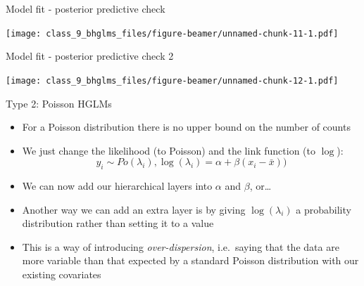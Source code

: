 \documentclass[ignorenonframetext,]{beamer}
\newenvironment{Shaded}{\begin{snugshade}}{\end{snugshade}}
\newcommand{\KeywordTok}[1]{\textcolor[rgb]{0.13,0.29,0.53}{\textbf{#1}}}
\newcommand{\DataTypeTok}[1]{\textcolor[rgb]{0.13,0.29,0.53}{#1}}
\newcommand{\DecValTok}[1]{\textcolor[rgb]{0.00,0.00,0.81}{#1}}
\newcommand{\StringTok}[1]{\textcolor[rgb]{0.31,0.60,0.02}{#1}}
\newcommand{\OperatorTok}[1]{\textcolor[rgb]{0.81,0.36,0.00}{\textbf{#1}}}
\newcommand{\NormalTok}[1]{#1}
\begin{document}
\begin{frame}[fragile]{Model fit - posterior predictive check}

\begin{Shaded}
\end{Shaded}

\texttt{[image: class\_9\_bhglms\_files/figure-beamer/unnamed-chunk-11-1.pdf]}

\end{frame}

\begin{frame}{Model fit - posterior predictive check 2}

\texttt{[image: class\_9\_bhglms\_files/figure-beamer/unnamed-chunk-12-1.pdf]}

\end{frame}

\begin{frame}{Type 2: Poisson HGLMs}

\begin{itemize}
\item
  For a Poisson distribution there is no upper bound on the number of
  counts
\item
  We just change the likelihood (to Poisson) and the link function (to
  \(\log\)):
  \[y_i \sim Po(\lambda_i), \log(\lambda_i) = \alpha + \beta (x_i - \bar{x}))\]
\item
  We can now add our hierarchical layers into \(\alpha\) and \(\beta\),
  or\ldots{}
\item
  Another way we can add an extra layer is by giving \(\log(\lambda_i)\)
  a probability distribution rather than setting it to a value
\item
  This is a way of introducing \emph{over-dispersion}, i.e.~saying that
  the data are more variable than that expected by a standard Poisson
  distribution with our existing covariates
\end{itemize}

\end{frame}
\end{document}
